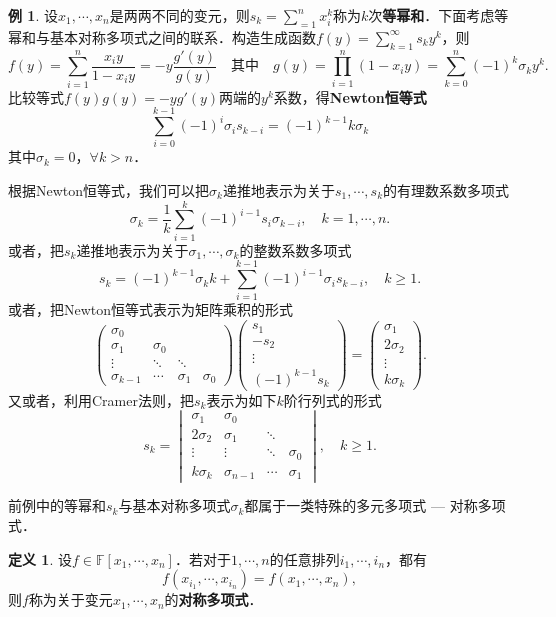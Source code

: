 \documentclass[a4paper,fontset=windows]{ctexbook}
\theoremstyle{definition}
\newtheorem{definition}{定义}[chapter]
\newtheorem{example}{例}[chapter]
\renewcommand{\ge}{\geqslant}
\begin{document}
\begin{example}
设$x_1,\cdots,x_n$是两两不同的变元，则$s_k=\sum\limits_{=1}^nx_i^k$称为$k$次{\bf 等幂和}．下面考虑等幂和与基本对称多项式之间的联系．构造生成函数$f(y)=\sum\limits_{k=1}^{\infty}s_ky^k$，则
$$f(y)=\sum_{i=1}^n\frac{x_iy}{1-x_iy}=-y\frac{g'(y)}{g(y)}\quad\text{其中}\quad g(y)=\prod_{i=1}^n(1-x_iy)=\sum_{k=0}^n(-1)^k\sigma_ky^k.$$
比较等式$f(y)g(y)=-yg'(y)$两端的$y^k$系数，得{\bf Newton恒等式}
$$\sum_{i=0}^{k-1}(-1)^i\sigma_is_{k-i}=(-1)^{k-1}k\sigma_k$$
其中$\sigma_k=0$，$\forall k>n$．

根据Newton恒等式，我们可以把$\sigma_k$递推地表示为关于$s_1,\cdots,s_k$的有理数系数多项式
$$\sigma_k=\frac{1}{k}\sum_{i=1}^k(-1)^{i-1}s_i\sigma_{k-i},\quad k=1,\cdots,n.$$
或者，把$s_k$递推地表示为关于$\sigma_1,\cdots,\sigma_k$的整数系数多项式
$$s_k=(-1)^{k-1}\sigma_k k+\sum_{i=1}^{k-1}(-1)^{i-1}\sigma_is_{k-i},\quad k\ge 1.$$
或者，把Newton恒等式表示为矩阵乘积的形式
$$\begin{pmatrix}\sigma_0&&& \\ \sigma_1&\sigma_0&& \\ \vdots&\ddots&\ddots& \\ \sigma_{k-1}&\cdots&\sigma_1&\sigma_0\end{pmatrix}\begin{pmatrix}s_1 \\ -s_2 \\ \vdots \\ (-1)^{k-1}s_k\end{pmatrix}=\begin{pmatrix}\sigma_1 \\ 2\sigma_2 \\ \vdots \\ k\sigma_k\end{pmatrix}.$$
又或者，利用Cramer法则，把$s_k$表示为如下$k$阶行列式的形式
$$s_k=\begin{vmatrix}\sigma_1&\sigma_0&& \\ 2\sigma_2&\sigma_1&\ddots& \\ \vdots&\vdots&\ddots&\sigma_0 \\ k\sigma_k&\sigma_{n-1}&\cdots&\sigma_1 \end{vmatrix},\quad k\ge 1.$$
\end{example}

前例中的等幂和$s_k$与基本对称多项式$\sigma_k$都属于一类特殊的多元多项式 — 对称多项式．

\begin{definition}
设$f\in\mathbb{F}[x_1,\cdots,x_n]$．若对于$1,\cdots,n$的任意排列$i_1,\cdots,i_n$，都有
$$f(x_{i_1},\cdots,x_{i_n})=f(x_1,\cdots,x_n),$$
则$f$称为关于变元$x_1,\cdots,x_n$的{\bf 对称多项式}．
\end{definition}
\end{document}
